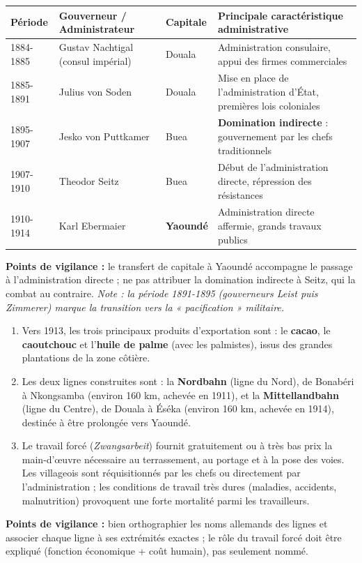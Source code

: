 \documentclass[11pt]{article}
\begin{document}
\begin{corrige}
\begin{center}
\begin{tabularx}{\linewidth}{|l|X|X|X|}\hline
\rowcolor{popblueL}\textbf{Période} & \textbf{Gouverneur / Administrateur} & \textbf{Capitale} & \textbf{Principale caractéristique administrative} \\ \hline
1884-1885 & Gustav Nachtigal (consul impérial) & Douala & Administration consulaire, appui des firmes commerciales \\ \hline
1885-1891 & Julius von Soden & Douala & Mise en place de l'administration d'État, premières lois coloniales \\ \hline
1895-1907 & Jesko von Puttkamer & Buea & \textbf{Domination indirecte} : gouvernement par les chefs traditionnels \\ \hline
1907-1910 & Theodor Seitz & Buea & Début de l'administration directe, répression des résistances \\ \hline
1910-1914 & Karl Ebermaier & \textbf{Yaoundé} & Administration directe affermie, grands travaux publics \\ \hline
\end{tabularx}
\end{center}
\textbf{Points de vigilance :} le transfert de capitale à Yaoundé accompagne le passage à l'administration directe ; ne pas attribuer la domination indirecte à Seitz, qui la combat au contraire. \emph{Note : la période 1891-1895 (gouverneurs Leist puis Zimmerer) marque la transition vers la « pacification » militaire.}
\end{corrige}

\begin{corrige}
\begin{enumerate}
    \item Vers 1913, les trois principaux produits d'exportation sont : le \textbf{cacao}, le \textbf{caoutchouc} et l'\textbf{huile de palme} (avec les palmistes), issus des grandes plantations de la zone côtière.
    \item Les deux lignes construites sont : la \textbf{Nordbahn} (ligne du Nord), de Bonabéri à Nkongsamba (environ 160 km, achevée en 1911), et la \textbf{Mittellandbahn} (ligne du Centre), de Douala à Éséka (environ 160 km, achevée en 1914), destinée à être prolongée vers Yaoundé.
    \item Le travail forcé (\emph{Zwangsarbeit}) fournit gratuitement ou à très bas prix la main-d'œuvre nécessaire au terrassement, au portage et à la pose des voies. Les villageois sont réquisitionnés par les chefs ou directement par l'administration ; les conditions de travail très dures (maladies, accidents, malnutrition) provoquent une forte mortalité parmi les travailleurs.
\end{enumerate}
\textbf{Points de vigilance :} bien orthographier les noms allemands des lignes et associer chaque ligne à ses extrémités exactes ; le rôle du travail forcé doit être expliqué (fonction économique + coût humain), pas seulement nommé.
\end{corrige}
\end{document}
